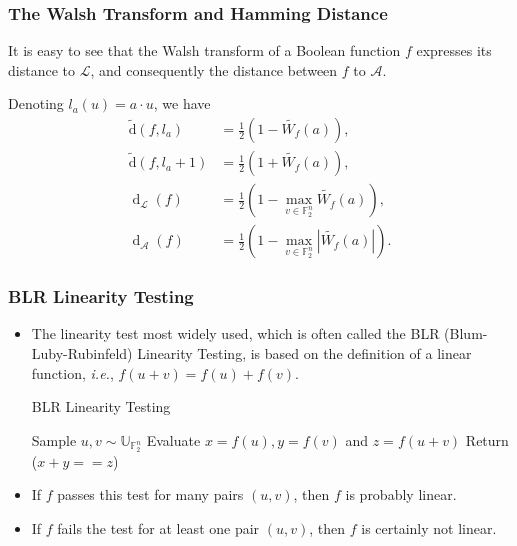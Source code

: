 \documentclass[
    aspectratio=169,                   %
]{beamer}
\newcommand{\F}{\mathbb{F}}
\newcommand{\dis}{\operatorname{\widetilde{d}}}
\newcommand{\nnl}{\operatorname{d}_{\mathcal{A}}}
\newcommand{\disl}{\operatorname{d}_{\mathcal{L}}}
\begin{document}
    \begin{frame}
        \frametitle{The Walsh Transform and Hamming Distance}
        It is easy to see that the Walsh transform of a Boolean function $f$ expresses its distance to $\mathcal{L}$, and consequently the distance between $f$ to $\mathcal{A}$.

        Denoting $l_{a}(u)=a\cdot u$, we have 
        \begin{align*}
            \dis(f,l_a)  &=\frac{1}{2}\left( 1-\widetilde{W_f}(a) \right),\\
            \dis(f,l_a+1)&=\frac{1}{2}\left( 1+\widetilde{W_f}(a) \right),\\
            \disl(f)     &=\frac{1}{2}\left( 1-\max_{v\in\F_2^n}\widetilde{W_f}(a) \right),\\
            \nnl(f)      &=\frac{1}{2}\left( 1-\max_{v\in\F_2^n}\left|\widetilde{W_f}(a)\right| \right).
        \end{align*}
    \end{frame}
    \begin{frame}
        \frametitle{BLR Linearity Testing}
        \begin{itemize}
            \item The linearity test most widely used, which is often called the BLR (Blum-Luby-Rubinfeld) Linearity Testing, is based on the definition of a linear function, \emph{i.e.}, $f(u+v)=f(u)+f(v)$.
            \begin{algorithm}[H]
                \caption{BLR Linearity Testing}
                 Sample $u,v\sim \mathbb{U}_{\F_2^n}$\; 
                 Evaluate $x = f(u), y=f(v)$ and $z = f(u + v)$\; 
                 Return ($x+y==z$)\; 
            \end{algorithm}
            \item If $f$ passes this test for many pairs $(u, v)$, then $f$ is probably linear.
            \item If $f$ fails the test for at least one pair $(u, v)$, then $f$ is certainly not linear. 
        \end{itemize}
    \end{frame}
\end{document}
